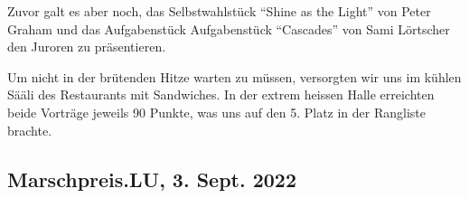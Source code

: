 \begin{history}
    Zuvor galt es aber noch, das Selbstwahlstück \enquote{Shine as the Light}
    von Peter Graham und das Aufgabenstück Aufgabenstück \enquote{Cascades} von
    Sami Lörtscher den Juroren zu präsentieren.

    Um nicht in der brütenden Hitze warten zu müssen, versorgten wir uns im
    kühlen Sääli des Restaurants mit Sandwiches. In der extrem heissen Halle
    erreichten beide Vorträge jeweils 90 Punkte, was uns auf den 5. Platz in der
    Rangliste brachte.

\end{history}

\subsection*{Marschpreis.LU, 3. Sept. 2022}

